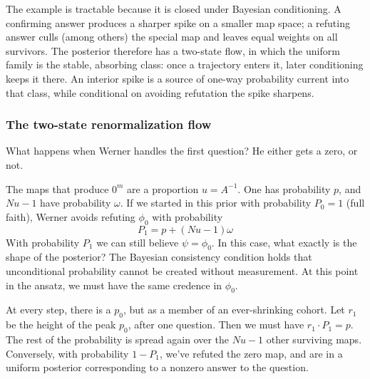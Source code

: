 \documentclass[11pt]{article}
\begin{document}
The example is tractable because it is closed under Bayesian
conditioning. A confirming answer produces a sharper spike on a
smaller map space; a refuting answer culls (among others) the special map and
leaves equal weights on all survivors. The posterior therefore has a
two-state flow, in which the uniform family is the stable, absorbing
class: once a trajectory enters it, later conditioning keeps it
there. An interior spike is a source of one-way probability current
into that class, while conditional on avoiding refutation the spike sharpens.

\subsubsection{The two-state renormalization flow}

What happens when Werner handles the first question? He either gets a zero, or not.

The maps that produce $0^m$ are a proportion $u=A^{-1}$. One has probability $p$, and $Nu-1$ have probability $\omega$.
If we started in this prior with probability $P_0=1$ (full faith), Werner avoids refuting $\phi_0$ with probability
%
\begin{equation}
  P_1 = p + \left(Nu-1\right)\omega
\end{equation}
%
With probability $P_1$ we can still believe $\psi = \phi_0$.
In this case, what exactly is the shape of the posterior? The Bayesian consistency condition holds that 
unconditional probability cannot be created without measurement. At this point in the ansatz, we must have the same credence in $\phi_0$. 

At every step, there is a $p_0$, but as a member of an ever-shrinking cohort.
Let $r_1$ be the height of the peak $p_0$, after one question. Then we must have $r_1\cdot P_1 = p$.
The rest of the probability is spread again over the $Nu-1$ other surviving maps. Conversely, with probability $1-P_1$, we've refuted the zero map, and are in a uniform posterior corresponding to a nonzero answer to the question.
\end{document}
